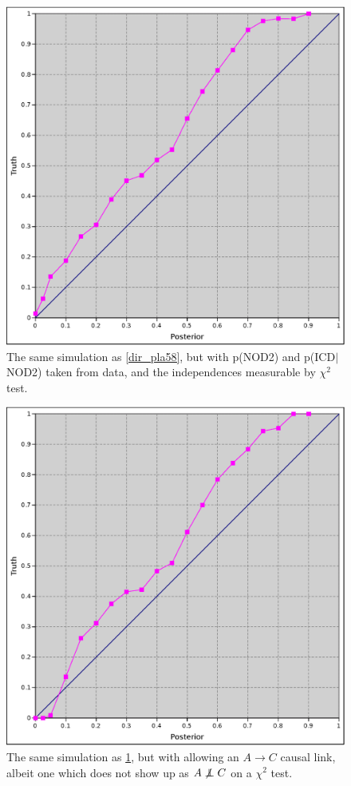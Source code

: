 \documentclass[twocolumn,12pt]{article}
\newcommand\indep{\protect\mathpalette{\protect\independenT}{\perp}}
\def\independenT#1#2{\mathrel{\rlap{$#1#2$}\mkern2mu{#1#2}}}
\begin{document}
\begin{figure}
  \includegraphics[width=\textwidth]{direction_crohns_58}
  \caption{The same simulation as \ref{dir_pla58}, but with p(NOD2) and
    p(ICD$|$NOD2) taken from data, and the independences measurable by
    $\chi^2$ test.}
  \label{dir_crohns58}
\end{figure}

\begin{figure}
  \includegraphics[width=\textwidth]{direction_multi_58}
  \caption{The same simulation as \ref{dir_crohns58}, but with
    allowing an $A\rightarrow C$ causal link, albeit one which does
    not show up as $A\not\indep C$ on a $\chi^2$ test.}
  \label{dir_multi58}
\end{figure}
\end{document}
